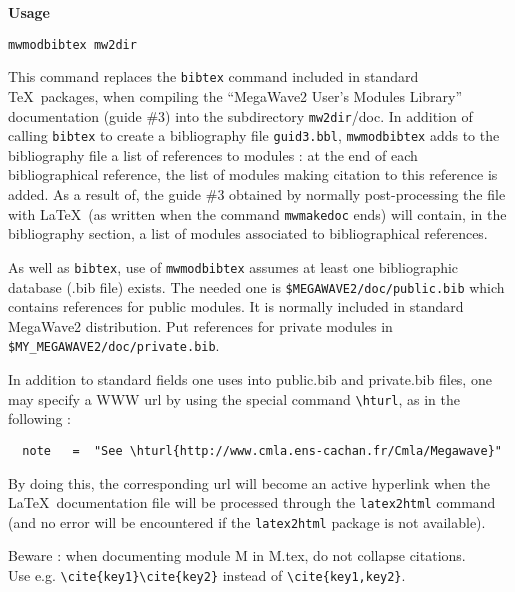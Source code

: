 \newpage

{\Large\bf Usage} \bigskip

\verb=mwmodbibtex mw2dir=

\Next

\Description
This command replaces the {\tt bibtex} command included in standard \TeX\ packages, when
compiling the ``MegaWave2 User's Modules Library'' documentation (guide \#3) into
the subdirectory {\tt mw2dir}/doc.
In addition of calling {\tt bibtex} to create a bibliography file {\tt guid3.bbl}, 
{\tt mwmodbibtex} adds to the bibliography file a list of references to modules : 
at the end of each bibliographical reference, the list of modules making citation to 
this reference is added. As a result of, the guide \#3 obtained by normally post-processing
the file with \LaTeX\ (as written when the command {\tt mwmakedoc} ends) will contain, 
in the bibliography section, a list of modules associated to bibliographical references.

As well as {\tt bibtex}, use of {\tt mwmodbibtex} assumes at least one bibliographic database
(.bib file) exists. The needed one is \verb+$MEGAWAVE2/doc/public.bib+ which contains references
for public modules. It is normally included in standard MegaWave2 distribution. Put references for 
private modules in \verb+$MY_MEGAWAVE2/doc/private.bib+.

In addition to standard fields one uses into public.bib and private.bib files, one may specify a WWW 
url by using the special command \verb+\hturl+, as in the following :
\begin{verbatim}
  note   =  "See \hturl{http://www.cmla.ens-cachan.fr/Cmla/Megawave}"
\end{verbatim}
By doing this, the corresponding url will become an active hyperlink when the \LaTeX\ 
documentation file will be processed through the {\tt latex2html} command (and no error
will be encountered if the {\tt latex2html} package is not available).

Beware : when documenting module M in M.tex, do not collapse citations.\\
Use e.g. \verb+\cite{key1}\cite{key2}+ instead of \verb+\cite{key1,key2}+. 

\newpage

